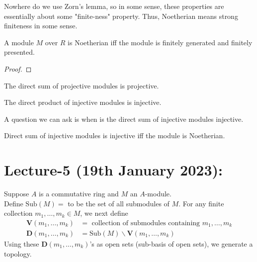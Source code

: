 \documentclass[oneside, 12pt, ]{scrbook}
\theoremstyle{theorem}
\begin{document}
Nowhere do we use Zorn's lemma, so in some sense, these properties are essentially about some "finite-ness" property. Thus, Noetherian means strong finiteness in some sense. 

\begin{definition}

\end{definition}

\begin{definition}

\end{definition}

\begin{theorem}
A module $M$ over $R$ is Noetherian iff the module is finitely generated and finitely presented. 
\end{theorem}

\begin{proof}

\end{proof}

\begin{proposition}
The direct sum of projective modules is projective. 
\end{proposition}

\begin{proposition}
The direct product of injective modules is injective.
\end{proposition}

A question we can ask is when is the direct sum of injective modules injective. 

\begin{proposition}
Direct sum of injective modules is injective iff the module is Noetherian.
\end{proposition}

\chapter{Lecture-5 (19th January 2023):}

Suppose $A$ is a commutative ring and $M$ an $A$-module. \\
Define $\mathrm{Sub}(M)=$ to be the set of all submodules of $M$. For any finite collection $m_{1}, \hdots , m_{k} \in M$, we next define 
\begin{align*}
\textbf{V}(m_{1}, \hdots , m_{k}) &= \text{ collection of submodules containing } m_{1}, \hdots , m_{k} \\
\textbf{D}( m_{1}, \hdots , m_{k}  ) &= \mathrm{Sub}(M) \backslash \textbf{V}(m_{1}, \hdots , m_{k}) 
\end{align*}
Using these $\textbf{D}(m_{1}, \hdots , m_{k})$'s as open sets (sub-basis of open sets), we generate a topology. 
\end{document}

